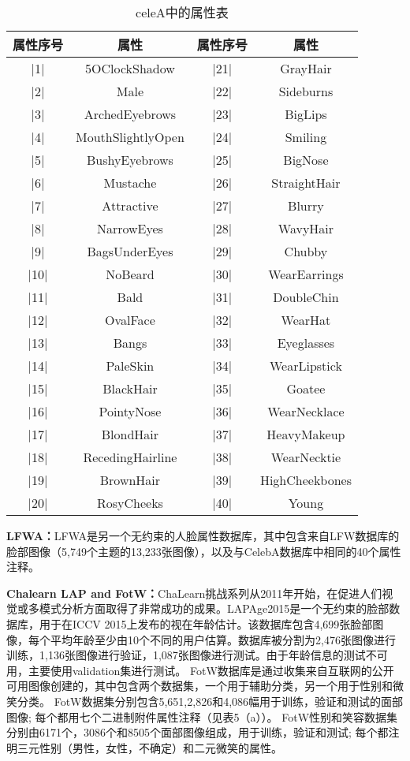  \begin{table}
  \centering
   \caption{celeA中的属性表}
   \label{tab:req-pkg}
   \begin{tabular}{c|c|c|c}
     \toprule
     属性序号 & 属性 &属性序号 & 属性 \\
     \midrule
     |1|  & 5OClockShadow		 & |21| & GrayHair \\
     |2|  & Male 				 		 & |22| & Sideburns \\
     |3|  & ArchedEyebrows  	 & |23| & BigLips \\
     |4|  & MouthSlightlyOpen  & |24| & Smiling \\
     |5|  & BushyEyebrows  		 & |25| & BigNose \\
     |6|  & Mustache           & |26| & StraightHair \\
     |7|  & Attractive         & |27| & Blurry\\   
     |8|  & NarrowEyes 			 & |28| & WavyHair \\
     |9|  & BagsUnderEyes  		 & |29| & Chubby \\  
     |10| & NoBeard            & |30| & WearEarrings\\   
     |11| & Bald               & |31| & DoubleChin  \\
     |12| & OvalFace           & |32| & WearHat \\
     |13| & Bangs              & |33| & Eyeglasses \\
     |14| & PaleSkin           & |34| & WearLipstick \\
     |15| & BlackHair          & |35| & Goatee \\
     |16| & PointyNose         & |36| & WearNecklace \\
     |17| & BlondHair          & |37| & HeavyMakeup\\
     |18| & RecedingHairline 	 & |38| & WearNecktie\\
     |19| & BrownHair          & |39| & HighCheekbones\\
     |20| & RosyCheeks 			 & |40| & Young\\
     \bottomrule
   \end{tabular}
 \end{table}

\textbf{LFWA：}LFWA是另一个无约束的人脸属性数据库，其中包含来自LFW数据库的脸部图像（5,749个主题的13,233张图像），以及与CelebA数据库中相同的40个属性注释。

\textbf{Chalearn LAP and FotW：}ChaLearn挑战系列从2011年开始，在促进人们视觉或多模式分析方面取得了非常成功的成果。LAPAge2015是一个无约束的脸部数据库，用于在ICCV 2015上发布的视在年龄估计。该数据库包含4,699张脸部图像，每个平均年龄至少由10个不同的用户估算。数据库被分割为2,476张图像进行训练，1,136张图像进行验证，1,087张图像进行测试。由于年龄信息的测试不可用，主要使用validation集进行测试。 FotW数据库是通过收集来自互联网的公开可用图像创建的，其中包含两个数据集，一个用于辅助分类，另一个用于性别和微笑分类。 FotW数据集分别包含5,651,2,826和4,086幅用于训练，验证和测试的面部图像; 每个都用七个二进制附件属性注释（见表5（a））。 FotW性别和笑容数据集分别由6171个，3086个和8505个面部图像组成，用于训练，验证和测试; 每个都注明三元性别（男性，女性，不确定）和二元微笑的属性。

